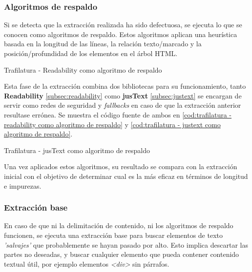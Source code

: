 \subsubsection{Algoritmos de respaldo}
\label{subsubsec:algoritmos de respaldo}

Si se detecta que la extracción realizada ha sido defectuosa, se ejecuta lo que se conocen como algoritmos 
de respaldo. Estos algoritmos aplican una heurística basada en la longitud de las líneas, la relación 
texto/marcado y la posición/profundidad de los elementos en el árbol HTML.

\begin{codefloat}
  
  \caption{Trafilatura - Readability como algoritmo de respaldo}
  \label{cod:trafilatura - readability como algoritmo de respaldo}
\end{codefloat}

Esta fase de la extracción combina dos bibliotecas para su funcionamiento, tanto \textbf{Readability}
\ref{subsec:readability} como \textbf{jusText} \ref{subsec:justext} se encargan de servir como redes de
seguridad y \emph{fallbacks} en caso de que la extracción anterior resultase errónea. Se muestra el código 
fuente de ambos en \ref{cod:trafilatura - readability como algoritmo de respaldo} y 
\ref{cod:trafilatura - justext como algoritmo de respaldo}.

\begin{codefloat}
  
  \caption{Trafilatura - jusText como algoritmo de respaldo}
  \label{cod:trafilatura - justext como algoritmo de respaldo}
\end{codefloat}

Una vez aplicados estos algoritmos, su resultado se compara con la extracción inicial con el objetivo de 
determinar cual es la más eficaz en términos de longitud e impurezas.

\subsubsection{Extracción base}
\label{subsubsec:extraccion base}

En caso de que ni la delimitación de contenido, ni los algoritmos de respaldo funcionen, se ejecuta una
extracción base para buscar elementos de texto \emph{'salvajes'} que probablemente se hayan pasado por alto.
Esto implica descartar las partes no deseadas, y buscar cualquier elemento que pueda contener contenido
textual útil, por ejemplo elementos \emph{<div>} sin párrafos.

